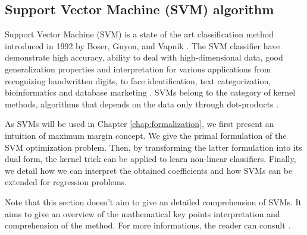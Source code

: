 \subsection{Support Vector Machine (SVM) algorithm}

Support Vector Machine (SVM) is a state of the art classification method introduced in 1992 by Boser, Guyon, and Vapnik \cite{Boser1992,Cortes1995}. The SVM classifier have demonstrate high accuracy, ability to deal with high-dimensional data, good generalization properties and interpretation for various applications from recognizing handwritten digits, to face identification, text categorization, bioinformatics and database marketing \cite{Wang2002,Yang1999,Heisele2001,Sadri2003,Campbell2011}. SVMs belong to the category of kernel methods, algorithms that depends on the data only through dot-products \cite{Schlkopf2013}.

As SVMs will be used in Chapter \ref{chap:formalization}, we first present an intuition of maximum margin concept. We give the primal formulation of the SVM optimization problem. Then, by transforming the latter formulation into its dual form, the kernel trick can be applied to learn non-linear classifiers. Finally, we detail how we can interpret the obtained coefficients and how SVMs can be extended for regression problems.

Note that this section doesn't aim to give an detailed comprehension of SVMs. It aims to give an overview of the mathematical key points interpretation and comprehension of the method. For more informations, the reader can consult \cite{Schlkopf2013,Campbell2011,Cortes1995}.

